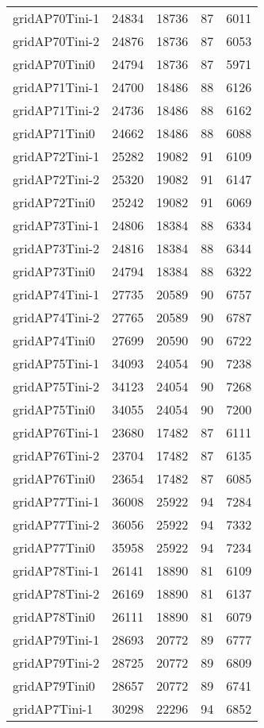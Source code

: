 \begin{tabular}{lrrrr}
gridAP70Tini-1 & 24834 & 18736 & 87 & 6011 \\
gridAP70Tini-2 & 24876 & 18736 & 87 & 6053 \\
gridAP70Tini0 & 24794 & 18736 & 87 & 5971 \\
gridAP71Tini-1 & 24700 & 18486 & 88 & 6126 \\
gridAP71Tini-2 & 24736 & 18486 & 88 & 6162 \\
gridAP71Tini0 & 24662 & 18486 & 88 & 6088 \\
gridAP72Tini-1 & 25282 & 19082 & 91 & 6109 \\
gridAP72Tini-2 & 25320 & 19082 & 91 & 6147 \\
gridAP72Tini0 & 25242 & 19082 & 91 & 6069 \\
gridAP73Tini-1 & 24806 & 18384 & 88 & 6334 \\
gridAP73Tini-2 & 24816 & 18384 & 88 & 6344 \\
gridAP73Tini0 & 24794 & 18384 & 88 & 6322 \\
gridAP74Tini-1 & 27735 & 20589 & 90 & 6757 \\
gridAP74Tini-2 & 27765 & 20589 & 90 & 6787 \\
gridAP74Tini0 & 27699 & 20590 & 90 & 6722 \\
gridAP75Tini-1 & 34093 & 24054 & 90 & 7238 \\
gridAP75Tini-2 & 34123 & 24054 & 90 & 7268 \\
gridAP75Tini0 & 34055 & 24054 & 90 & 7200 \\
gridAP76Tini-1 & 23680 & 17482 & 87 & 6111 \\
gridAP76Tini-2 & 23704 & 17482 & 87 & 6135 \\
gridAP76Tini0 & 23654 & 17482 & 87 & 6085 \\
gridAP77Tini-1 & 36008 & 25922 & 94 & 7284 \\
gridAP77Tini-2 & 36056 & 25922 & 94 & 7332 \\
gridAP77Tini0 & 35958 & 25922 & 94 & 7234 \\
gridAP78Tini-1 & 26141 & 18890 & 81 & 6109 \\
gridAP78Tini-2 & 26169 & 18890 & 81 & 6137 \\
gridAP78Tini0 & 26111 & 18890 & 81 & 6079 \\
gridAP79Tini-1 & 28693 & 20772 & 89 & 6777 \\
gridAP79Tini-2 & 28725 & 20772 & 89 & 6809 \\
gridAP79Tini0 & 28657 & 20772 & 89 & 6741 \\
gridAP7Tini-1 & 30298 & 22296 & 94 & 6852 \\

\end{tabular}
